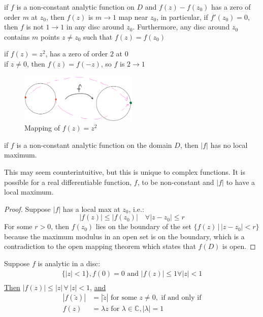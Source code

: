 \begin{corollary}

    if $f$ is a non-constant analytic function on $D$ and $f(z) - f(z_0)$ has a zero of order $m$ at $z_0$, then $f(z)$ is $m \to 1$ map near $z_0$, in particular, if $f'(z_0) = 0$, then $f$ is not $1 \to 1$ in any disc around $z_0$. Furthermore, any disc around $z_0$ contains $m$ points $z \neq z_0$ such that $f(z) = f(z_0)$
\end{corollary}

\begin{example}
    if $f(z) = z^2$, has a zero of order $2$ at $0$\\
    if $z \neq 0$, then $f(z) = f(-z)$, so $f$ is $2 \to 1$
\end{example}
\begin{figure}[H]
    \centering
    \includegraphics[width=0.5\textwidth]{LECTURE_15/max-mod.png}
    \caption{Mapping of $f(z) = z^2$}
\end{figure}
\begin{corollary}
    if $f$ is a non-constant analytic function on the domain $D$, then $|f|$ has no local maximum.
\end{corollary}

\begin{remark}
    This may seem counterintuitive, but this is unique to complex functions. It is possible for a real differentiable function, $f$, to be non-constant and $|f|$ to have a local maximum.
\end{remark}

\begin{proof}
    Suppose $|f|$ has a local max at $z_0$, i.e.:
    $$|f(z)| \leq |f(z_0)| \quad \forall |z - z_0| \leq r$$
    For some $r > 0$, then $f(z_0)$ lies on the boundary of the set $\{f(z) \, | \, |z - z_0| < r\}$ because the maximum modulus in an open set is on the boundary, which is a contradiction to the open mapping theorem which states that $f(D)$ is open.
\end{proof}

\begin{theorem}
    Suppose $f$ is analytic in a disc:
    \begin{align}
        \{|z| < 1\}, f(0) = 0 \text{ and } |f(z)| \leq 1 \forall |z| < 1 \\
    \end{align}
    \underline{Then} $|f(z)| \leq |z|\, \forall \, |z| < 1$, \underline{and}
    \begin{align}
        |f(\tilde{z})| & = |\tilde{z}| \text{ for some } z \neq 0, \text{ if and only if} \\
        f(z)           & = \lambda z \text{ for } \lambda \in \mathbb{C}, |\lambda| = 1
    \end{align}
\end{theorem}

